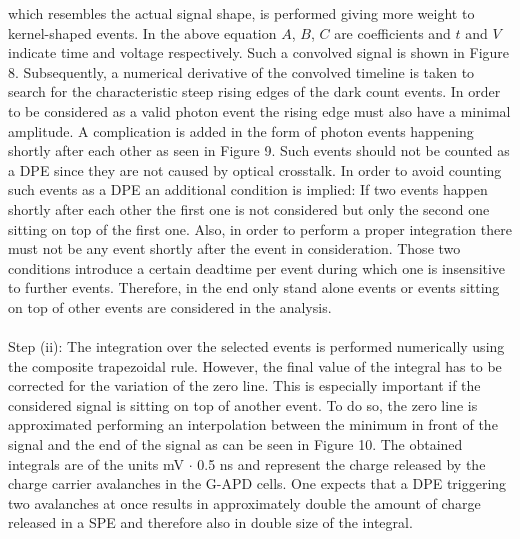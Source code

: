 \documentclass[10pt,a4paper]{article}
\begin{document}
\begin{multicols}{2}
which resembles the actual signal shape, is performed giving more weight to kernel-shaped events. In the above equation $A$, $B$, $C$ are coefficients and $t$ and $V$ indicate time and voltage respectively. Such a convolved signal is shown in Figure 8. Subsequently, a numerical derivative of the convolved timeline is taken to search for the characteristic steep rising edges of the dark count events. In order to be considered as a valid photon event the rising edge must also have a minimal amplitude. A complication is added in the form of photon events happening shortly after each other as seen in Figure 9. Such events should not be counted as a DPE since they are not caused by optical crosstalk. In order to avoid counting such events as a DPE an additional condition is implied: If two events happen shortly after each other the first one is not considered but only the second one sitting on top of the first one. Also, in order to perform a proper integration there must not be any event shortly after the event in consideration. Those two conditions introduce a certain deadtime per event during which one is insensitive to further events. Therefore, in the end only stand alone events or events sitting on top of other events are considered in the analysis.\\  \\  \noindent
Step (ii): The integration over the selected events is performed numerically using the composite trapezoidal rule. However, the final value of the integral has to be corrected for the variation of the zero line. This is especially important if the considered signal is sitting on top of another event. To do so, the zero line is approximated performing an interpolation between the minimum in front of the signal and the end of the signal as can be seen in Figure 10. The obtained integrals are of the units mV $\cdot$ 0.5 ns and represent the charge released by the charge carrier avalanches in the G-APD cells. One expects that a DPE triggering two avalanches at once results in approximately double the amount of charge released in a SPE and therefore also in double size of the integral.\\  \\  \noindent

\end{multicols}
\end{document}
